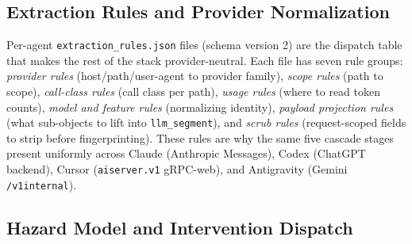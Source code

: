 \documentclass[conference]{IEEEtran}
\begin{document}
\subsection{Extraction Rules and Provider Normalization}
\label{app:warpos-extraction}

Per-agent \texttt{extraction\_rules.json} files (schema version 2) are the dispatch table that makes the rest of the stack provider-neutral. Each file has seven rule groups: \emph{provider rules} (host/path/user-agent to provider family), \emph{scope rules} (path to scope), \emph{call-class rules} (call class per path), \emph{usage rules} (where to read token counts), \emph{model and feature rules} (normalizing identity), \emph{payload projection rules} (what sub-objects to lift into \texttt{llm\_segment}), and \emph{scrub rules} (request-scoped fields to strip before fingerprinting). These rules are why the same five cascade stages present uniformly across Claude (Anthropic Messages), Codex (ChatGPT backend), Cursor (\texttt{aiserver.v1} gRPC-web), and Antigravity (Gemini \texttt{/v1internal}).

\subsection{Hazard Model and Intervention Dispatch}
\label{app:warpos-hazard}
\end{document}

